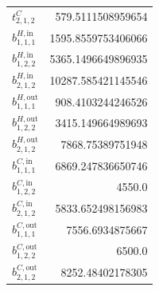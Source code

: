 \documentclass{article}%
\begin{document}
\begin{multicols*}{3}
\begin{supertabular}{lr}
	$t_{2,1,2}^{C}$ & 579.5111508959654 \\%
	$b_{1,1,1}^{H,\text{in}}$ & 1595.8559753406066 \\%
	$b_{1,2,2}^{H,\text{in}}$ & 5365.1496649896935 \\%
	$b_{2,1,2}^{H,\text{in}}$ & 10287.585421145546 \\%
	$b_{1,1,1}^{H,\text{out}}$ & 908.4103244246526 \\%
	$b_{1,2,2}^{H,\text{out}}$ & 3415.149664989693 \\%
	$b_{2,1,2}^{H,\text{out}}$ & 7868.75389751948 \\%
	$b_{1,1,1}^{C,\text{in}}$ & 6869.247836650746 \\%
	$b_{1,2,2}^{C,\text{in}}$ & 4550.0 \\%
	$b_{2,1,2}^{C,\text{in}}$ & 5833.652498156983 \\%
	$b_{1,1,1}^{C,\text{out}}$ & 7556.6934875667 \\%
	$b_{1,2,2}^{C,\text{out}}$ & 6500.0 \\%
	$b_{2,1,2}^{C,\text{out}}$ & 8252.48402178305 \\%
\end{supertabular}%
\end{multicols*}%
\clearpage%
\end{document}
